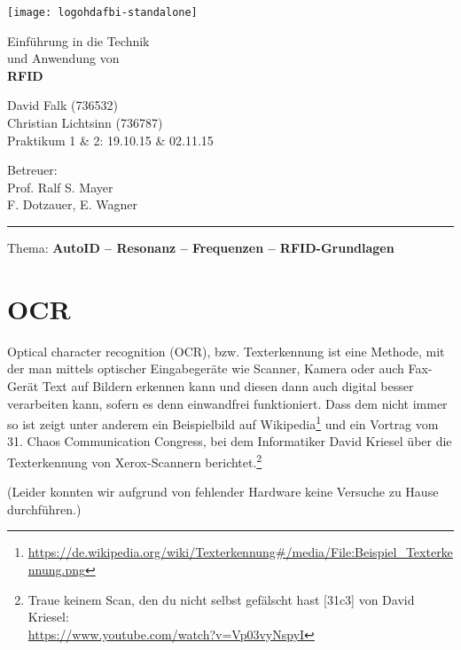 \documentclass[a4paper,11pt,headsepline,footsepline,parskip=half]{scrartcl}
\newcommand\HRule{\noindent\rule{\linewidth}{1.5pt}}
\begin{document}
\begin{titlepage}

\begin{minipage}[c]{5cm}
\texttt{[image: logohdafbi-standalone]}
\end{minipage}
\hfil
\begin{minipage}[c]{10cm}
\begin{flushright}
\Large Einführung in die Technik\\und Anwendung von\\
\LARGE \textbf{RFID}
\end{flushright}
\end{minipage}

\vspace*{1cm}

\begin{minipage}[c]{8cm}
\begin{flushleft}
\large David Falk (736532)\\Christian Lichtsinn (736787)\\Praktikum 1 \& 2: 19.10.15 \& 02.11.15
\end{flushleft}
\end{minipage}
\hfil
\begin{minipage}[c]{8cm}
\begin{flushright}
\large Betreuer:\\Prof. Ralf S. Mayer\\F. Dotzauer, E. Wagner
\end{flushright}
\end{minipage}

\vspace*{1cm}

\HRule

\vspace*{1cm}

\noindent
\large Thema: \textbf{AutoID -- Resonanz -- Frequenzen -- RFID-Grundlagen}

\normalsize

\section{OCR}

Optical character recognition (OCR), bzw. Texterkennung ist eine Methode, mit der man mittels optischer
Eingabegeräte wie Scanner, Kamera oder auch Fax-Gerät Text auf Bildern erkennen kann und diesen dann auch
digital besser verarbeiten kann, sofern es denn einwandfrei funktioniert. Dass dem nicht immer so ist zeigt
unter anderem ein Beispielbild auf Wikipedia\footnote{\url{https://de.wikipedia.org/wiki/Texterkennung\#/media/File:Beispiel_Texterkennung.png}}
und ein Vortrag vom 31. Chaos Communication Congress, bei dem Informatiker David Kriesel über die Texterkennung
von Xerox-Scannern berichtet.\footnote{Traue keinem Scan, den du nicht selbst gefälscht hast [31c3] von David Kriesel:\\ \url{https://www.youtube.com/watch?v=Vp03vyNspyI}}

(Leider konnten wir aufgrund von fehlender Hardware keine Versuche zu Hause durchführen.)

\end{titlepage}
\end{document}
